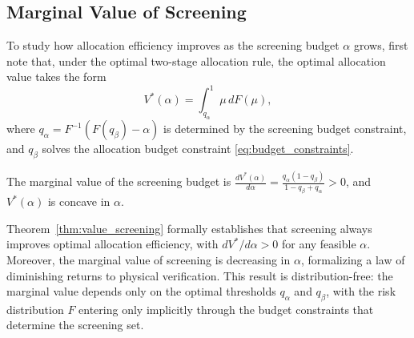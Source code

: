 \subsection{Marginal Value of Screening}
\label{sec:marginal_value}

To study how allocation efficiency improves as the screening budget $\alpha$ grows, first note that, under the optimal two-stage allocation rule, the optimal allocation value takes the form
\begin{equation}\label{eq:value}
    V^*(\alpha) = \int_{q_\alpha}^{1} \mu \, dF(\mu),
\end{equation}
where $q_\alpha = F^{-1}(F(q_\beta) - \alpha)$ is determined by the screening budget constraint, and $q_\beta$ solves the allocation budget constraint \eqref{eq:budget_constraints}.

\begin{theorem}
\label{thm:value_screening}
The marginal value of the screening budget is $\frac{dV^*(\alpha)}{d\alpha} = \frac{q_\alpha(1 - q_\beta)}{1 - q_\beta + q_\alpha} > 0$,
and $V^*(\alpha)$ is concave in $\alpha$.
\end{theorem}

Theorem~\ref{thm:value_screening} formally establishes that screening always improves optimal allocation efficiency, with $dV^*/d\alpha > 0$ for any feasible $\alpha$. Moreover, the marginal value of screening is decreasing in $\alpha$, formalizing a law of diminishing returns to physical verification. This result is distribution-free: the marginal value depends only on the optimal thresholds $q_\alpha$ and $q_\beta$, with the risk distribution $F$ entering only implicitly through the budget constraints that determine the screening set.





